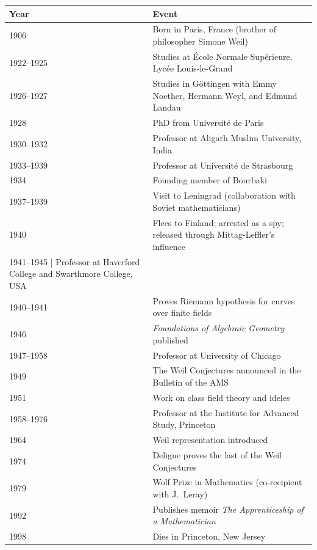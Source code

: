 \begin{tabularx}{\linewidth}{|p{1.5cm}|>{\raggedright\arraybackslash}X|}
\hline
\textbf{Year} & \textbf{Event} \\ \hline
1906 & Born in Paris, France (brother of philosopher Simone Weil) \\ \hline
1922--1925 & Studies at {\'E}cole Normale Sup{\'e}rieure, Lyc\'{e}e Louis-le-Grand \\ \hline
1926--1927 & Studies in G\"{o}ttingen with Emmy Noether, Hermann Weyl, and Edmund Landau \\ \hline
1928 & PhD from Universit\'{e} de Paris \\ \hline
1930--1932 & Professor at Aligarh Muslim University, India \\ \hline
1933--1939 & Professor at Universit\'{e} de Strasbourg \\ \hline
1934 & Founding member of Bourbaki \\ \hline
1937--1939 & Visit to Leningrad (collaboration with Soviet mathematicians) \\ \hline
1940 & Flees to Finland; arrested as a spy; released through Mittag-Leffler's influence \\ \hline
1941--1945 | Professor at Haverford College and Swarthmore College, USA \\ \hline
1940--1941 & Proves Riemann hypothesis for curves over finite fields \\ \hline
1946 & \textit{Foundations of Algebraic Geometry} published \\ \hline
1947--1958 & Professor at University of Chicago \\ \hline
1949 & The Weil Conjectures announced in the Bulletin of the AMS \\ \hline
1951 & Work on class field theory and ideles \\ \hline
1958--1976 & Professor at the Institute for Advanced Study, Princeton \\ \hline
1964 & Weil representation introduced \\ \hline
1974 & Deligne proves the last of the Weil Conjectures \\ \hline
1979 & Wolf Prize in Mathematics (co-recipient with J.\ Leray) \\ \hline
1992 & Publishes memoir \textit{The Apprenticeship of a Mathematician} \\ \hline
1998 & Dies in Princeton, New Jersey \\ \hline
\end{tabularx}
